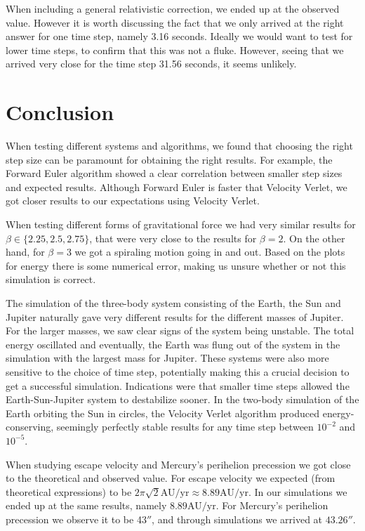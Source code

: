 \documentclass[reprint, english,notitlepage,nofootinbib]{revtex4-1}  %
\begin{document}
When including a general relativistic correction, we ended up at the observed value. However it is worth discussing the fact that we only arrived at the right answer for one time step, namely 3.16 seconds. Ideally we would want to test for lower time steps, to confirm that this was not a fluke. However, seeing that we arrived very close for the time step 31.56 seconds, it seems unlikely.

\section{Conclusion}

When testing different systems and algorithms, we found that choosing the right step size can be paramount for obtaining the right results. For example, the Forward Euler algorithm showed a clear correlation between smaller step sizes and expected results. Although Forward Euler is faster that Velocity Verlet, we got closer results to our expectations using Velocity Verlet.

When testing different forms of gravitational force we had very similar results for $\beta \in \{2.25,2.5,2.75\}$, that were very close to the results for $\beta = 2$. On the other hand, for $\beta = 3$ we got a spiraling motion going in and out. Based on the plots for energy there is some numerical error, making us unsure whether or not this simulation is correct.

The simulation of the three-body system consisting of the Earth, the Sun and Jupiter naturally gave very different results for the different masses of Jupiter. For the larger masses, we saw clear signs of the system being unstable. The total energy oscillated and eventually, the Earth was flung out of the system in the simulation with the largest mass for Jupiter. These systems were also more sensitive to the choice of time step, potentially making this a crucial decision to get a successful simulation. Indications were that smaller time steps allowed the Earth-Sun-Jupiter system to destabilize sooner. In the two-body simulation of the Earth orbiting the Sun in circles, the Velocity Verlet algorithm produced energy-conserving, seemingly perfectly stable results for any time step between $10^{-2}$ and $10^{-5}$.

When studying escape velocity and Mercury's perihelion precession we got close to the theoretical and observed value. For escape velocity we expected (from theoretical expressions) to be $2\pi\sqrt{2}\text{AU/yr} \approx 8.89\text{AU/yr}$. In our simulations we ended up at the same results, namely $8.89\text{AU/yr}$. For Mercury's perihelion precession we observe it to be 43$''$, and through simulations we arrived at $43.26''$.
\end{document}
